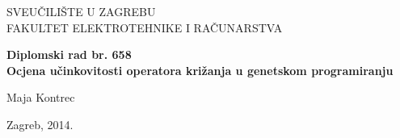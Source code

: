 \begin{titlepage}

\begin{center}
	
	{\large SVEUČILIŠTE U ZAGREBU\\FAKULTET ELEKTROTEHNIKE I RAČUNARSTVA}
	
	\vfill

	\textbf{ \large Diplomski rad br. 658} \\


	\vspace{20pt}
	\textbf{\huge Ocjena učinkovitosti operatora križanja u genetskom programiranju}
	\vspace{40pt}
	
	\bigskip
	
	\begin{minipage}{1.0\textwidth}
	\begin{center} 
	Maja Kontrec
	\end{center}
	\end{minipage}
	\vfill

	{\large Zagreb, 2014.}
	
\end{center}

\end{titlepage}